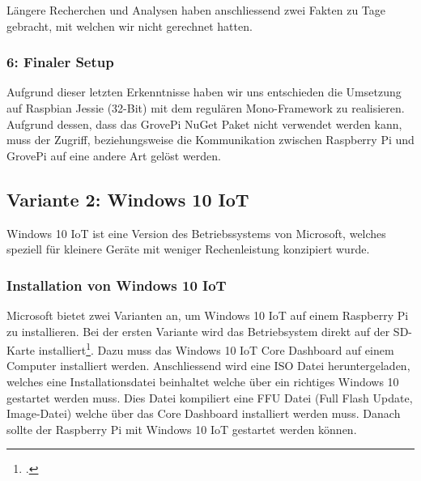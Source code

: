 Längere Recherchen und Analysen haben anschliessend zwei Fakten zu Tage gebracht, mit welchen wir nicht gerechnet hatten.
\begin{itemize}
\end{itemize}


\subsubsection{6: Finaler Setup}
Aufgrund dieser letzten Erkenntnisse haben wir uns entschieden die Umsetzung auf Raspbian Jessie (32-Bit) mit dem regulären Mono-Framework zu realisieren. Aufgrund dessen, dass das GrovePi NuGet Paket nicht verwendet werden kann, muss der Zugriff, beziehungsweise die Kommunikation zwischen Raspberry Pi und GrovePi auf eine andere Art gelöst werden.


\subsection{Variante 2: Windows 10 IoT}
Windows 10 IoT ist eine Version des Betriebssystems von Microsoft, welches speziell für kleinere Geräte mit weniger Rechenleistung konzipiert wurde.

\subsubsection{Installation von Windows 10 IoT}
Microsoft bietet zwei Varianten an, um Windows 10 IoT auf einem Raspberry Pi zu installieren. Bei der ersten Variante wird das Betriebsystem direkt auf der SD-Karte installiert\footcite{install_win10iot_2016-04-25}. Dazu muss das Windows 10 IoT Core Dashboard auf einem Computer installiert werden. Anschliessend wird eine ISO Datei heruntergeladen, welches eine Installationsdatei beinhaltet welche über ein richtiges Windows 10 gestartet werden muss. Dies Datei kompiliert eine FFU Datei (Full Flash Update, Image-Datei) welche über das Core Dashboard installiert werden muss. Danach sollte der Raspberry Pi mit Windows 10 IoT gestartet werden können. 

